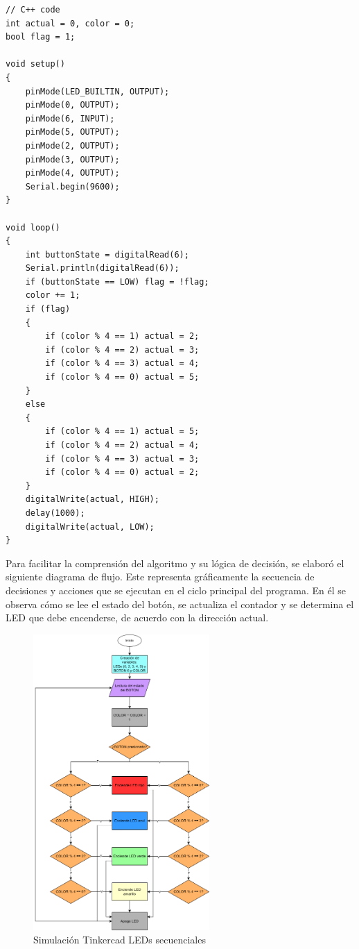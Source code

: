 \documentclass{article}
\begin{document}
\begin{lstlisting}[style=cppstyle, caption={Código en C++ para el control de LEDs secuenciales.}, label={code:leds_secuenciales}]
// C++ code
int actual = 0, color = 0;
bool flag = 1;

void setup()
{
    pinMode(LED_BUILTIN, OUTPUT);
    pinMode(0, OUTPUT);
    pinMode(6, INPUT);
    pinMode(5, OUTPUT);
    pinMode(2, OUTPUT);
    pinMode(3, OUTPUT);
    pinMode(4, OUTPUT);
    Serial.begin(9600);
}

void loop()
{ 
    int buttonState = digitalRead(6);
    Serial.println(digitalRead(6));
    if (buttonState == LOW) flag = !flag;
    color += 1;
    if (flag)
    {
        if (color % 4 == 1) actual = 2;
        if (color % 4 == 2) actual = 3;
        if (color % 4 == 3) actual = 4;
        if (color % 4 == 0) actual = 5;
    } 
    else 
    {
        if (color % 4 == 1) actual = 5;
        if (color % 4 == 2) actual = 4;
        if (color % 4 == 3) actual = 3;
        if (color % 4 == 0) actual = 2;
    }
    digitalWrite(actual, HIGH);
    delay(1000);
    digitalWrite(actual, LOW);
}
\end{lstlisting}

Para facilitar la comprensión del algoritmo y su lógica de decisión, se elaboró el siguiente diagrama de flujo. Este representa gráficamente la secuencia de decisiones y acciones que se ejecutan en el ciclo principal del programa. En él se observa cómo se lee el estado del botón, se actualiza el contador y se determina el LED que debe encenderse, de acuerdo con la dirección actual.

\begin{figure}[H]
    \centering
    \includegraphics[width=0.6\textwidth]{./img/ckpt_6_1.png}
    \caption{Simulación Tinkercad LEDs secuenciales}
    \label{fig:leds_secuenciales_flowchart}
\end{figure}
\end{document}
